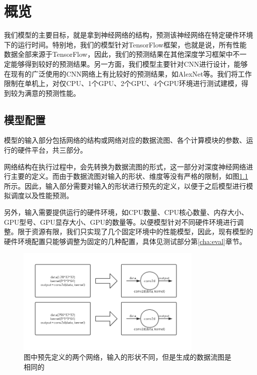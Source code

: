 \chapter{概览}
\label{cap:overview}
    我们模型的主要目标，就是拿到神经网络的结构，预测该神经网络在特定硬件环境下的运行时间。特别地，我们的模型针对TensorFlow框架，也就是说，所有性能数据全部来源于TensorFlow，因此，我们的预测结果在其他深度学习框架中不一定能够得到较好的预测结果。另一方面，我们模型主要针对CNN进行设计，能够在现有的广泛使用的CNN网络上有比较好的预测结果，如AlexNet\cite{alexnet}等。我们将工作限制在单机上，对仅CPU、1个GPU、2个GPU、4个GPU环境进行测试建模，得到较为满意的预测性能。
    
\section{模型配置}
    模型的输入部分包括网络的结构或网络对应的数据流图、各个计算模块的参数、运行的硬件平台，共三部分。
    
    网络结构在执行过程中，会先转换为数据流图的形式，这一部分对深度神经网络进行主要的定义。而由于数据流图对输入的形状、维度等没有严格的限制，如图\ref{fig:dag_same}所示。因此，输入部分需要对输入的形状进行预先的定义，以便于之后模型进行模拟调度以及性能预测。
    
    另外，输入需要提供运行的硬件环境，如CPU数量、CPU核心数量、内存大小、GPU型号、GPU显存大小、GPU的数量等。以便模型针对不同硬件环境进行调整。限于资源有限，我们只实现了几个固定环境中的性能模型，因此，现有模型的硬件环境配置只能够调整为固定的几种配置，具体见测试部分第\ref{cha:eval}章节。

    \begin{figure}[!htbp]
        \centering
        \includegraphics[width=0.8\textwidth]{figures/dag_same.jpg}
        \caption{图中预先定义的两个网络，输入的形状不同，但是生成的数据流图是相同的}
        \label{fig:dag_same}
    \end{figure}
    
